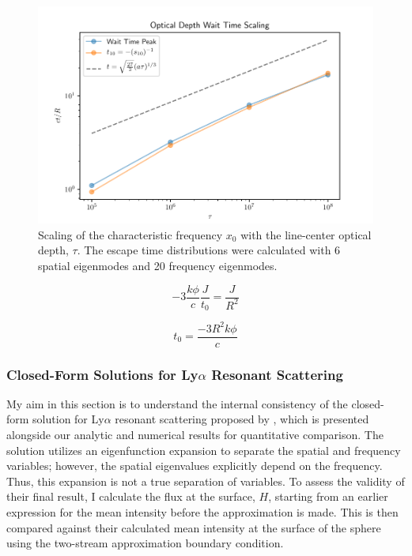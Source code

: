 \documentclass[onecolumn]{aastex63}
\begin{document}
\begin{figure}
    \centering
    \includegraphics[width=\textwidth]{tau_scaling.pdf}
    \caption{Scaling of the characteristic frequency $x_0$ with the line-center optical depth, $\tau$. The escape time distributions were calculated with 6 spatial eigenmodes and 20 frequency eigenmodes.}
    \label{tau_scaling}
\end{figure}

\begin{equation}
    -3\frac{k\phi}{c}\frac{J}{t_0} = \frac{J}{R^2}
\end{equation}

\begin{equation}
    t_0 = \frac{-3R^2k\phi}{c}
\end{equation}


\subsubsection{Closed-Form Solutions for Ly$\alpha$ Resonant Scattering}

My aim in this section is to understand the internal consistency of the closed-form solution for Ly$\alpha$ resonant scattering proposed by \cite{2006ApJ...649...14D}, which is presented alongside our analytic and numerical results for quantitative comparison. The solution utilizes an eigenfunction expansion to separate the spatial and frequency variables; however, the spatial eigenvalues explicitly depend on the frequency. Thus, this expansion is not a true separation of variables. To assess the validity of their final result, I calculate the flux at the surface, $H$, starting from an earlier expression for the mean intensity before the approximation is made. This is then compared against their calculated mean intensity at the surface of the sphere using the two-stream approximation boundary condition.
\end{document}
